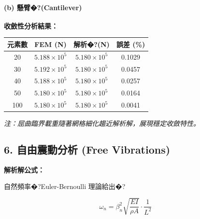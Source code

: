 \documentclass[UTF8, a4paper, 12pt]{ctexart}
\begin{document}
\paragraph{(b) 懸臂�?(Cantilever)}



\textbf{收斂性分析結果：}



\begin{center}

\begin{tabular}{cccc}

\toprule

\textbf{元素數} & \textbf{FEM (N)} & \textbf{解析�?(N)} & \textbf{誤差 (\%)} \\

\midrule

20 & $5.188\times10^5$ & $5.180\times10^5$ & 0.1029 \\

30 & $5.192\times10^5$ & $5.180\times10^5$ & 0.0457 \\

40 & $5.188\times10^5$ & $5.180\times10^5$ & 0.0257 \\

50 & $5.180\times10^5$ & $5.180\times10^5$ & 0.0164 \\

100 & $5.180\times10^5$ & $5.180\times10^5$ & 0.0041 \\

\bottomrule

\end{tabular}

\end{center}



\textit{注：屈曲臨界載重隨著網格細化趨近解析解，展現穩定收斂特性。}



\subsection{6. 自由震動分析 (Free Vibrations)}



\textbf{解析解公式：}

自然頻率�?Euler-Bernoulli 理論給出�?

\begin{equation}

    \omega_n = \beta_n^2 \sqrt{\frac{EI}{\rho A}} \cdot \frac{1}{L^2}

\end{equation}
\end{document}
